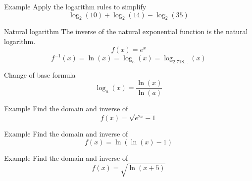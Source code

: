\documentclass[t]{beamer}
\begin{document}
\begin{frame}{Example}
Apply the logarithm rules to simplify 
$$\log_2(10) + \log_2(14) - \log_2(35)$$
\end{frame}

\begin{frame}{Natural logarithm}
The inverse of the natural exponential function is
the natural logarithm.
$$f(x) = e^x$$
$$f^{-1}(x) = \ln(x) = \log_e(x) = \log_{2.718 \ldots} (x)$$
\end{frame}

\begin{frame}{Change of base formula}
$$\log_a(x) = \frac{\ln(x)}{\ln(a)}$$
\end{frame}

\begin{frame}{Example}
Find the domain and inverse of 
$$f(x) = \sqrt{e^{2x} -1}$$
\end{frame}


\begin{frame}{Example}
Find the domain and inverse of 
$$f(x) = \ln(\ln(x) -1)$$
\end{frame}


\begin{frame}{Example}
Find the domain and inverse of 
$$f(x) = \sqrt{\ln(x +5)}$$
\end{frame}
\end{document}

